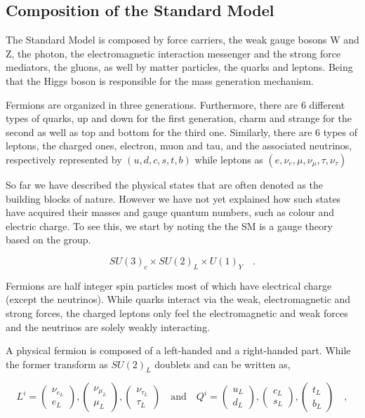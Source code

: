 \subsection{Composition of the Standard Model}

{ \color{red}
The Standard Model is composed by force carriers, the weak gauge bosons W and Z, the photon, the electromagnetic interaction messenger and the strong force mediators, the gluons, as well by matter particles, the quarks and leptons. Being that the Higgs boson is responsible for the mass generation mechanism.

Fermions are organized in three generations. Furthermore, there are 6 different types of quarks, up and down for the first generation, charm and strange for the second as well as top and bottom for the third one. Similarly, there are 6 types of leptons, the charged ones, electron, muon and tau, and the associated neutrinos, respectively represented by $(u,d,c,s,t,b)$ while leptons as $(e,\nu_{e},\mu,\nu_{\mu},\tau,\nu_{\tau})$

So far we have described the physical states that are often denoted as the building blocks of nature. However we have not yet explained how such states have acquired their masses and gauge quantum numbers, such as colour and electric charge. To see this, we start by noting the the SM is a gauge theory based on the group.

\begin{equation}
SU(3)_c \times SU(2)_L \times U(1)_Y \quad  .
\label{SMsymmetry}
\end{equation} 

Fermions are half integer spin particles most of which have electrical charge (except the neutrinos).  While quarks interact via the weak, electromagnetic and strong forces, the charged leptons only feel the electromagnetic and weak forces and the neutrinos are solely weakly interacting.  

A physical fermion is composed of a left-handed and a right-handed part. While the former transform as $SU(2)_L$ doublets and can be written as,

\begin{equation}
L^i= \begin{pmatrix}
\nu_{e_L} \\ e_L 
\end{pmatrix},
\begin{pmatrix}
\nu_{\mu_L} \\ \mu_L 
\end{pmatrix},
\begin{pmatrix}
\nu_{\tau_L} \\ \tau_L 
\end{pmatrix} 
\quad 
\text{and} \quad Q^i= \begin{pmatrix}
u_{L} \\
d_L 
\end{pmatrix},\begin{pmatrix}
c_{L} \\
s_L 
\end{pmatrix}
,\begin{pmatrix}
t_{L} \\
b_L 
\end{pmatrix} \quad ,
\end{equation}

}
